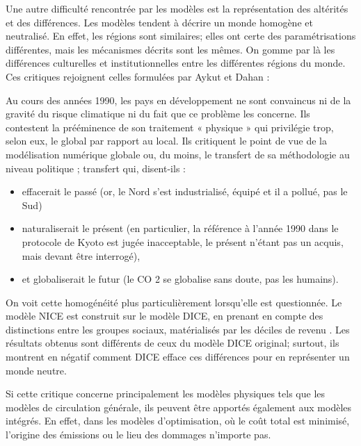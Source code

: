 Une autre difficulté rencontrée par les modèles est la représentation des altérités et des différences. Les modèles tendent à décrire un monde homogène et neutralisé. En effet, les régions sont similaires; elles ont certe des paramétrisations différentes, mais les mécanismes décrits sont les mêmes. On gomme par là les différences culturelles et institutionnelles entre les différentes régions du monde. \\

Ces critiques rejoignent celles formulées par Aykut et Dahan : 

\begin{displayquote}
    Au cours des années 1990, les pays en développement ne sont convaincus ni de la gravité du risque climatique ni du fait que ce problème les concerne. Ils contestent la prééminence de son traitement « physique » qui privilégie trop, selon eux, le global par rapport au local. Ils critiquent le point de vue de la modélisation numérique globale ou, du moins, le transfert de sa méthodologie au niveau politique ; transfert qui, disent-ils :  
    \begin{itemize}
        \item effacerait le passé (or, le Nord s’est industrialisé, équipé et il a pollué, pas le Sud)
	    \item naturaliserait le présent (en particulier, la référence à l’année 1990 dans le protocole de Kyoto est jugée inacceptable, le présent n’étant pas un acquis, mais devant être interrogé),
	   \item et globaliserait le futur (le CO 2 se globalise sans doute, pas les humains).
    \end{itemize}
\end{displayquote}
On voit cette homogénéité plus particulièrement lorsqu'elle est questionnée. Le modèle NICE est construit sur le modèle DICE, en prenant en compte des distinctions entre les groupes sociaux, matérialisés par les déciles de revenu \cite{dennig_inequality_2015}. Les résultats obtenus sont différents de ceux du modèle DICE original; surtout, ils montrent en négatif comment DICE efface ces différences pour en représenter un monde neutre. 

Si cette critique concerne principalement les modèles physiques tels que les modèles de circulation générale, ils peuvent être apportés également aux modèles intégrés. En effet, dans les modèles d'optimisation, où le coût total est minimisé, l'origine des émissions ou le lieu des dommages n'importe pas.  


